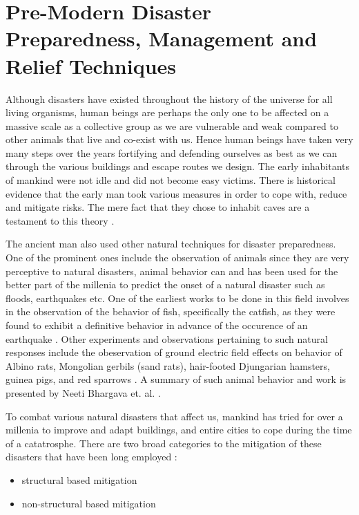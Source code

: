 \section{Pre-Modern Disaster Preparedness, Management and Relief Techniques}
\label{sec:pastwork:Pre-Modern Disaster Preparedness, Management and Relief Techniques}

Although disasters have existed throughout the history of the universe for all living organisms, human beings are perhaps the only one to be affected on a massive scale as a collective group as we are vulnerable and weak compared to other animals that live and co-exist with us. Hence human beings have taken very many steps over the years fortifying and defending ourselves as best as we can through the various buildings and escape routes we design. The early inhabitants of mankind were not idle and did not become easy victims. There is historical evidence that the early man took various measures in order to cope with, reduce and mitigate risks. The mere fact that they chose to inhabit caves are a testament to this theory \cite{ref6}.

The ancient man also used other natural techniques for disaster preparedness. One of the prominent ones include the observation of animals since they are very perceptive to natural disasters, animal behavior can and has been used for the better part of the millenia to predict the onset of a natural disaster such as floods, earthquakes etc. One of the earliest works to be done in this field involves in the observation of the behavior of fish, specifically the catfish, as they were found to exhibit a definitive behavior in advance of the occurence of an earthquake \cite{ref7}. Other experiments and observations pertaining to such natural responses include the obeservation of ground electric field effects on behavior of Albino rats, Mongolian gerbils (sand rats), hair-footed Djungarian hamsters, guinea pigs, and red sparrows \cite{ref8}. A summary of such animal behavior and work is presented by Neeti Bhargava et. al. \cite{ref9}.

To combat various natural disasters that affect us, mankind has tried for over a millenia to improve and adapt buildings, and entire cities to cope during the time of a catatrosphe. There are two broad categories to the mitigation of these disasters that have been long employed \cite{ref10}:

\begin{itemize}
  \item structural based mitigation
  \item non-structural based mitigation
\end{itemize} 

